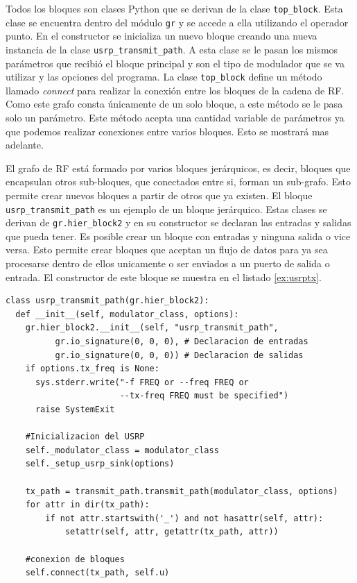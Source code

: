 Todos los bloques son clases Python que se derivan de la clase \verb|top_block|. Esta clase se
encuentra dentro del m\'odulo \verb|gr| y se accede a ella utilizando el operador punto. En el
constructor se inicializa un nuevo bloque creando una nueva instancia de la clase
\verb|usrp_transmit_path|. A esta clase se le pasan los mismos par\'ametros que recibi\'o el bloque
principal y son el tipo de modulador que se va utilizar y las opciones del programa. La clase
\verb|top_block| define un m\'etodo llamado \emph{connect} para realizar la conexi\'on entre los
bloques de la cadena de RF. Como este grafo consta \'unicamente de un solo bloque, a este m\'etodo
se le pasa solo un par\'ametro. Este m\'etodo acepta una cantidad variable de par\'ametros ya que
podemos realizar conexiones entre varios bloques. Esto se mostrar\'a mas adelante.

El grafo de RF est\'a formado por varios bloques jer\'arquicos, es decir, bloques que encapsulan
otros sub-bloques, que conectados entre si, forman un sub-grafo. Esto permite crear nuevos bloques a
partir de otros que ya existen. El bloque \verb|usrp_transmit_path| es un ejemplo de un bloque
jer\'arquico. Estas clases se derivan de \verb|gr.hier_block2| y en su constructor se declaran las
entradas y salidas que pueda tener. Es posible crear un bloque con entradas y ninguna salida o vice
versa. Esto permite crear bloques que aceptan un flujo de datos para ya sea procesarse dentro de
ellos unicamente o ser enviados a un puerto de salida o entrada. El constructor de este bloque se
muestra en el listado \ref{ex:usrptx}.

\begin{lstlisting}[float, frame=single, label=ex:usrptx, caption={Constructor del bloque transmisor
del USRP.}] 
class usrp_transmit_path(gr.hier_block2):
  def __init__(self, modulator_class, options):
    gr.hier_block2.__init__(self, "usrp_transmit_path",
          gr.io_signature(0, 0, 0), # Declaracion de entradas
          gr.io_signature(0, 0, 0)) # Declaracion de salidas
    if options.tx_freq is None:
      sys.stderr.write("-f FREQ or --freq FREQ or 
                       --tx-freq FREQ must be specified")
      raise SystemExit

    #Inicializacion del USRP
    self._modulator_class = modulator_class
    self._setup_usrp_sink(options)

    tx_path = transmit_path.transmit_path(modulator_class, options)
    for attr in dir(tx_path): 
        if not attr.startswith('_') and not hasattr(self, attr):
            setattr(self, attr, getattr(tx_path, attr))

    #conexion de bloques
    self.connect(tx_path, self.u)
\end{lstlisting}

